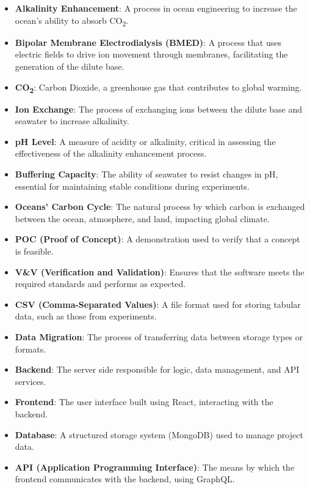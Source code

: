 \documentclass[12pt]{article}
\begin{document}
\begin{itemize}
    \item \textbf{Alkalinity Enhancement}: A process in ocean engineering to
    increase the ocean's ability to absorb CO\textsubscript{2}.
    \item \textbf{Bipolar Membrane Electrodialysis (BMED)}: A process that uses
    electric fields to drive ion movement through membranes, facilitating the
    generation of the dilute base.
    \item \textbf{CO\textsubscript{2}}: Carbon Dioxide, a greenhouse gas that
    contributes to global warming.
    \item \textbf{Ion Exchange}: The process of exchanging ions between the
    dilute base and seawater to increase alkalinity.
    \item \textbf{pH Level}: A measure of acidity or alkalinity, critical in
    assessing the effectiveness of the alkalinity enhancement process.
    \item \textbf{Buffering Capacity}: The ability of seawater to resist changes
    in pH, essential for maintaining stable conditions during experiments.
    \item \textbf{Oceans' Carbon Cycle}: The natural process by which carbon is
    exchanged between the ocean, atmosphere, and land, impacting global climate.
    \item \textbf{POC (Proof of Concept)}: A demonstration used to verify that a
    concept is feasible.
    \item \textbf{V\&V (Verification and Validation)}: Ensures that the software
    meets the required standards and performs as expected.
    \item \textbf{CSV (Comma-Separated Values)}: A file format used for storing
    tabular data, such as those from experiments.
    \item \textbf{Data Migration}: The process of transferring data between
    storage types or formats.
    \item \textbf{Backend}: The server side responsible for logic, data
    management, and API services.
    \item \textbf{Frontend}: The user interface built using React, interacting
    with the backend.
    \item \textbf{Database}: A structured storage system (MongoDB) used to
    manage project data.
    \item \textbf{API (Application Programming Interface)}: The means by which
    the frontend communicates with the backend, using GraphQL.

\end{itemize}
\end{document}
